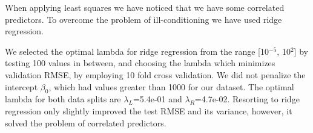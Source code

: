 \documentclass{article} %
\begin{document}
When applying least squares we have noticed that we have some correlated
predictors. To overcome the problem of ill-conditioning we have used ridge
regression.


We selected the optimal lambda for ridge regression from the range [10$^{-5}$, 10$^2$] 
by testing 100 values in between, and choosing the lambda which minimizes validation RMSE, 
by employing 10 fold cross validation. We did not penalize the intercept $\beta_0$, which had 
values greater than 1000 for our dataset. The optimal lambda for both data splits 
are $\lambda_L$=5.4e-01 and $\lambda_R$=4.7e-02. 
Resorting to ridge regression only slightly improved the test RMSE and its variance, 
however, it solved the problem of correlated predictors.




\end{document}
